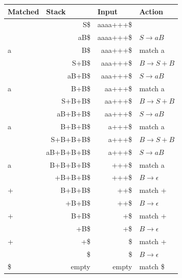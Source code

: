 \documentclass[onecolumn,oneside]{SUSTechHomework}
\begin{document}
  \begin{table}[H]
    \begin{tabular}{|l|r|r|l|}
    \hline
    Matched & \multicolumn{1}{l|}{Stack} & \multicolumn{1}{l|}{Input} & Action   \\ \hline
            & S\$                        & aaaa+++\$                  &          \\ \hline
            & aB\$                       & aaaa+++\$                  & $S \rightarrow aB$      \\ \hline
    a       & B\$                        & aaa+++\$                   & match a  \\ \hline
            & S+B\$                      & aaa+++\$                   & $B \rightarrow S+B$     \\ \hline
            & aB+B\$                         & aaa+++\$                   & $S \rightarrow aB$      \\ \hline
    a       & B+B\$                         & aa+++\$                    & match a  \\ \hline
            & S+B+B\$                         & aa+++\$                    & $B \rightarrow S+B$     \\ \hline
            & aB+B+B\$                         & aa+++\$                    & $S \rightarrow aB$      \\ \hline
    a       & B+B+B\$                         & a+++\$                     & match a  \\ \hline
            & S+B+B+B\$                         & a+++\$                     & $B \rightarrow S+B$     \\ \hline
            & aB+B+B+B\$                         & a+++\$                     & $S \rightarrow aB$      \\ \hline
    a       & B+B+B+B\$                         & +++\$                      & match a  \\ \hline
            & +B+B+B\$                         & +++\$                      & $B \rightarrow \epsilon$        \\ \hline
    +       & B+B+B\$                         & ++\$                       & match +  \\ \hline
            & +B+B\$                         & ++\$                       & $B \rightarrow \epsilon$        \\ \hline
    +       & B+B\$                         & +\$                        & match +  \\ \hline
            & +B\$                         & +\$                        & $B \rightarrow \epsilon$        \\ \hline
    +       & +\$                         & \$                         & match +  \\ \hline
            & \$                         & \$                         & $B \rightarrow \epsilon$        \\ \hline
    \$      & empty                      & empty                      & match \$ \\ \hline
    \end{tabular}
    \end{table}
\end{document}
